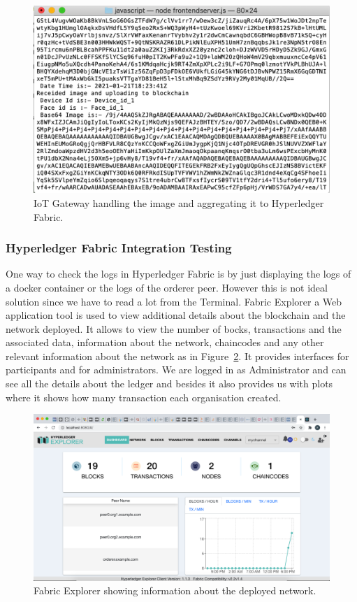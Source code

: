 \begin{figure}[!htb]
    \centering
    \includegraphics[width=1\textwidth]{figures/nodejs.png}
    \caption{IoT Gateway handling the image and aggregating it to Hyperledger Fabric.}
    \label{fig:nodejs}
\end{figure}

\subsubsection{Hyperledger Fabric Integration Testing}

One way to check the logs in Hyperledger Fabric is by just displaying the logs of a docker container or the logs of the orderer peer. However this is not ideal solution since we have to read a lot from the Terminal. Fabric Explorer a Web application tool is used to view additional details about the blockchain and the network deployed. It allows to view the number of bocks, transactions and the associated data, information about the network, chaincodes and any other relevant information about the network as in Figure~\ref{fig:fabric_explorer}. It provides interfaces for participants and for administrators. We are logged in as Administrator and can see all the details about the ledger and besides it also provides us with plots where it shows how many transaction each organisation created. 


\begin{figure}[!htb]
    \centering
    \includegraphics[width=1\textwidth]{figures/explorer_overall.png}
    \caption{Fabric Explorer showing information about the deployed network.}
    \label{fig:fabric_explorer}
\end{figure}

